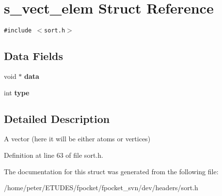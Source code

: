 \hypertarget{structs__vect__elem}{
\section{s\_\-vect\_\-elem Struct Reference}
\label{structs__vect__elem}
}
{\tt \#include $<$sort.h$>$}

\subsection*{Data Fields}
\begin{CompactItemize}
\item 
\hypertarget{structs__vect__elem_dee718cfa819e62df8d0025cfa0a0b77}{
void $\ast$ \textbf{data}}
\label{structs__vect__elem_dee718cfa819e62df8d0025cfa0a0b77}

\item 
\hypertarget{structs__vect__elem_2ea1d3638dc578035aa17dfb4ffe4525}{
int \textbf{type}}
\label{structs__vect__elem_2ea1d3638dc578035aa17dfb4ffe4525}

\end{CompactItemize}


\subsection{Detailed Description}
A vector (here it will be either atoms or vertices) 

Definition at line 63 of file sort.h.

The documentation for this struct was generated from the following file:\begin{CompactItemize}
\item 
/home/peter/ETUDES/fpocket/fpocket\_\-svn/dev/headers/sort.h\end{CompactItemize}
